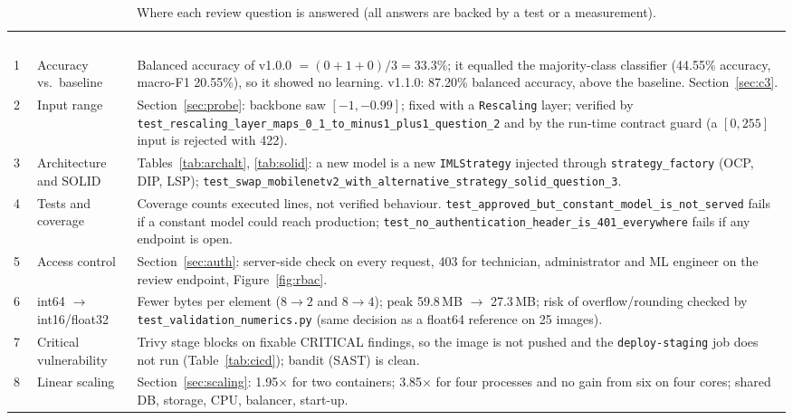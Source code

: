 \documentclass[12pt,a4paper]{article}
\newcommand{\fp}[1]{\nolinkurl{#1}}
\newcommand{\hd}[1]{\textcolor{white}{\textbf{#1}}}
\begin{document}
\begin{table}[H]
\centering
\caption{Where each review question is answered (all answers are backed by a test or a measurement).}
\label{tab:questions}
\renewcommand{\arraystretch}{1.25}
\begin{tabularx}{\textwidth}{C{0.6cm} L{4.2cm} Y}
\hd{Q} & \hd{Topic} & \hd{Answer and evidence} \\
1 & Accuracy vs.\ baseline & Balanced accuracy of v1.0.0 $=(0+1+0)/3=33.3\%$; it equalled the majority-class classifier (44.55\% accuracy, macro-F1 20.55\%), so it showed no learning. v1.1.0: 87.20\% balanced accuracy, above the baseline. Section~\ref{sec:c3}. \\
2 & Input range & Section~\ref{sec:probe}: backbone saw $[-1,-0.99]$; fixed with a \texttt{Rescaling} layer; verified by \fp{test_rescaling_layer_maps_0_1_to_minus1_plus1_question_2} and by the run-time contract guard (a $[0,255]$ input is rejected with 422). \\
3 & Architecture and SOLID & Tables~\ref{tab:archalt}, \ref{tab:solid}: a new model is a new \texttt{IMLStrategy} injected through \texttt{strategy\_factory} (OCP, DIP, LSP); \fp{test_swap_mobilenetv2_with_alternative_strategy_solid_question_3}. \\
4 & Tests and coverage & Coverage counts executed lines, not verified behaviour. \fp{test_approved_but_constant_model_is_not_served} fails if a constant model could reach production; \fp{test_no_authentication_header_is_401_everywhere} fails if any endpoint is open. \\
5 & Access control & Section~\ref{sec:auth}: server-side check on every request, 403 for technician, administrator and ML engineer on the review endpoint, Figure~\ref{fig:rbac}. \\
6 & int64 $\to$ int16/float32 & Fewer bytes per element ($8\to2$ and $8\to4$); peak 59.8\,MB $\to$ 27.3\,MB; risk of overflow/rounding checked by \fp{test_validation_numerics.py} (same decision as a float64 reference on 25 images). \\
7 & Critical vulnerability & Trivy stage blocks on fixable CRITICAL findings, so the image is not pushed and the \texttt{deploy-staging} job does not run (Table~\ref{tab:cicd}); bandit (SAST) is clean. \\
8 & Linear scaling & Section~\ref{sec:scaling}: 1.95$\times$ for two containers; 3.85$\times$ for four processes and no gain from six on four cores; shared DB, storage, CPU, balancer, start-up. \\

\end{tabularx}
\end{table}
\end{document}
